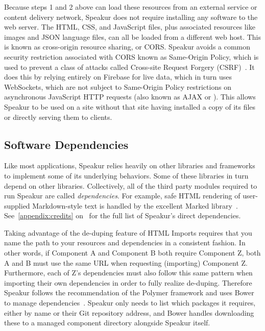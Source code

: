 Because steps 1 and 2 above can load these resources from an external service or content delivery network,
Speakur does not require installing any software to the web server.
The HTML, CSS, and JavaScript files, plus associated resources like images and JSON language files, 
can all be loaded from a different web host. 
This is known as cross-origin resource sharing, or CORS.
Speakur avoids a common security restriction associated with CORS known as Same-Origin Policy, which is used to prevent a class of attacks called Cross-site Request Forgery (CSRF)~\cite{mozillacontributors2015-b}.
It does this by relying entirely on Firebase for live data,
which in turn uses WebSockets,
which are not subject to Same-Origin Policy restrictions on asynchronous JavaScript HTTP requests (also known as AJAX or ).
This allows Speakur to be used on a site without that site having installed a copy of its files or directly serving them to clients.

\subsection{Software Dependencies}
\label{sec:dependencies}
Like most applications, Speakur relies heavily on other libraries and frameworks to implement some of its underlying behaviors. 
Some of these libraries in turn depend on other libraries.
Collectively, all of the third party modules required to run Speakur are called \textit{dependencies}.
For example, safe HTML rendering of user-supplied Markdown-style text is handled by the excellent Marked library~\cite{christopherjeffrey2014}.
See~\cref{appendix:credits} on~ for the full list of Speakur's direct dependencies.

Taking advantage of the de-duping feature of HTML Imports
requires that you name the path to your resources and dependencies in a consistent fashion.
In other words, if Component A and Component B both require Component Z, both A and B must use the same URL when requesting (importing) Component Z.
Furthermore, each of Z's dependencies must also follow this same pattern when importing their own dependencies in order to fully realize de-duping.
Therefore Speakur follows the recommendation of the Polymer framework and uses Bower to manage dependencies~\cite{bowercontributors2015}. 
Speakur only needs to list which packages it requires, either by name or their Git repository address, 
and Bower handles downloading these to a managed component directory alongside Speakur itself.

